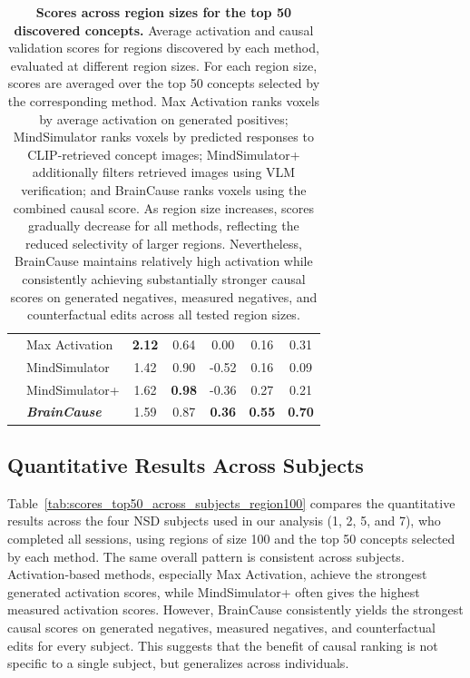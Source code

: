 \documentclass{llmxive}
\begin{document}
\begin{table}[!htbp]
\begin{tabular}{@{}clccccc@{}}
\addlinespace[2pt]
\midrule

\multirow{4}{*}{1000}
& Max Activation
& \textbf{2.12} & 0.64 & 0.00 & 0.16 & 0.31 \\
& MindSimulator
& 1.42 & 0.90 & -0.52 & 0.16 & 0.09 \\
& MindSimulator+
& 1.62 & \textbf{0.98} & -0.36 & 0.27 & 0.21 \\
& \emph{\textbf{BrainCause}}
& 1.59 & 0.87 & \textbf{0.36} & \textbf{0.55} & \textbf{0.70} \\

\bottomrule
\end{tabular}
\label{tab:scores_top50_all_roi_sizes}
\vspace{-0.3cm}
\caption{\textbf{Scores across region sizes for the top 50 discovered concepts.}
Average activation and causal validation scores for regions discovered by each method, evaluated at different region sizes. For each region size, scores are averaged over the top 50 concepts selected by the corresponding method. Max Activation ranks voxels by average activation on generated positives; MindSimulator ranks voxels by predicted responses to CLIP-retrieved concept images; MindSimulator+ additionally filters retrieved images using VLM verification; and BrainCause ranks voxels using the combined causal score. As region size increases, scores gradually decrease for all methods, reflecting the reduced selectivity of larger regions. Nevertheless, BrainCause maintains relatively high activation while consistently achieving substantially stronger causal scores on generated negatives, measured negatives, and counterfactual edits across all tested region sizes.}
\end{table}






\subsection{Quantitative Results Across Subjects}
\label{sec_sup:Quantitative_across_sbuecjts}

Table~\ref{tab:scores_top50_across_subjects_region100} compares the quantitative results across the four NSD subjects used in our analysis (1, 2, 5, and 7), who completed all sessions, using regions of size 100 and the top 50 concepts selected by each method. The same overall pattern is consistent across subjects. Activation-based methods, especially Max Activation, achieve the strongest generated activation scores, while MindSimulator+ often gives the highest measured activation scores. However, BrainCause consistently yields the strongest causal scores on generated negatives, measured negatives, and counterfactual edits for every subject. This suggests that the benefit of causal ranking is not specific to a single subject, but generalizes across individuals.
\end{document}
